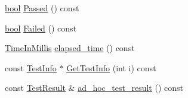 \begin{DoxyCompactItemize}
\hyperlink{classbool}{bool} \hyperlink{classtesting_1_1TestCase_a29bbfd227b732a90198b5280c039c271}{Passed} () const
\item 
\hyperlink{classbool}{bool} \hyperlink{classtesting_1_1TestCase_ae71c30eab6f1673b82090a0e745c2aa5}{Failed} () const
\item 
\hyperlink{namespacetesting_a992de1d091ce660f451d1e8b3ce30fd6}{Time\+In\+Millis} \hyperlink{classtesting_1_1TestCase_acd7d6a77bce06da6ef90f5dad1c4def1}{elapsed\+\_\+time} () const
\item 
const \hyperlink{classtesting_1_1TestInfo}{Test\+Info} $\ast$ \hyperlink{classtesting_1_1TestCase_a441e0eca232643671dc365c2924c255c}{Get\+Test\+Info} (int i) const
\item 
const \hyperlink{classtesting_1_1TestResult}{Test\+Result} \& \hyperlink{classtesting_1_1TestCase_a6d5fc5003bc3352f3ddae7dadc6d2364}{ad\+\_\+hoc\+\_\+test\+\_\+result} () const
\end{DoxyCompactItemize}
